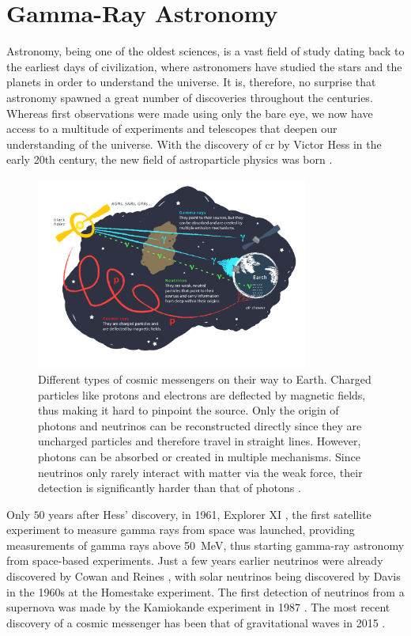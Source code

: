 \chapter{Gamma-Ray Astronomy}
\label{ch:gamma-ray-astronomy}

Astronomy, being one of the oldest sciences, is a vast field of study dating back to the earliest
days of civilization, where astronomers have studied the stars and the planets in order to understand
the universe. It is, therefore, no surprise that astronomy spawned a great number of discoveries
throughout the centuries. Whereas first observations were made using only the bare eye, we now have access to a multitude
of experiments and telescopes that deepen our understanding of the universe. With the discovery of
\gls{cr} by Victor Hess in the early 20th century, the new field of astroparticle physics was born \cite{longair1981}.

\begin{figure}
    \centering
    \includegraphics[width=0.8\textwidth]{graphics/figure5.png}
    \caption{Different types of cosmic messengers on their way to Earth. Charged particles like protons and electrons
    are deflected by magnetic fields, thus making it hard to pinpoint the source. Only the
    origin of photons and neutrinos can be reconstructed directly since they are uncharged particles
    and therefore travel in straight lines. However, photons can be absorbed or created in multiple
    mechanisms. Since neutrinos only rarely interact with matter via the weak force, their detection
    is significantly harder than that of photons \cite{fig5}.}
    \label{fig:fig5}
\end{figure}

Only \(\num{50}\) years after Hess' discovery, in 1961, Explorer XI \cite{explorer11}, the first satellite experiment
to measure gamma rays from space was launched, providing measurements of gamma rays above
\SI{50}{\mega\eV}, thus starting gamma-ray astronomy from space-based experiments. Just a few years
earlier neutrinos were already discovered by Cowan and Reines \cite{cowan1956}, with solar neutrinos being
discovered by Davis \etal{} \cite{davis} in the 1960s at the Homestake experiment.
The first detection of neutrinos from a supernova was made by the Kamiokande experiment in 1987
\cite{kamiokande1987}. The most recent discovery of a cosmic messenger has been that of gravitational
waves in 2015 \cite{grav_waves}.

